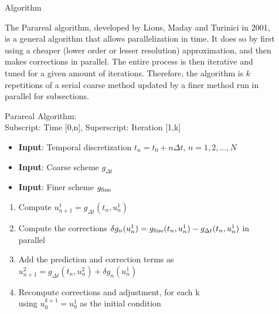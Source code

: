 \documentclass[final]{beamer}
\newlength{\sepwid}
\newlength{\onecolwid}
\begin{document}
\begin{frame}[t]
\begin{columns}[t]
\begin{column}{\onecolwid}
\begin{block}{Algorithm}

The Parareal algorithm, developed by Lions, Maday and Turinici in 2001, is
a general algorithm that allows parallelization in time. It does so by first using a
cheaper (lower order or lesser resolution) approximation, and then makes
corrections in parallel. The entire process is then iterative and tuned for a
given amount of iterations. Therefore, the algorithm is $k$ repetitions of a
serial coarse method updated by a finer method run in parallel for subsections.

Parareal Algorithm:\\
Subscript: Time [0,n], Superscript: Iteration [1,k]
\begin{itemize}
    \item \textbf{Input}: Temporal discretization $t_n = t_0 + n \Delta t, \, n =
        1,2,\ldots,N$
    \item \textbf{Input}: Coarse scheme $g_{\Delta t}$
    \item \textbf{Input}: Finer scheme $g_{\textnormal{fine}}$
\end{itemize}

\begin{enumerate}
    \item Compute $u^1_{n+1} = g_{\Delta t}(t_n, u^1_n)$
    \item Compute the corrections $\delta g_n(u^1_n) =
        g_{\textnormal{fine}}(t_n, u^1_n) - g_{\Delta t}(t_n, u^1_n)$ in parallel
    \item Add the prediction and correction terms as $u^2_{n+1} = g_{\Delta
        t}(t_n, u^2_n) + \delta g_n(u^1_n)$
    \item Recompute corrections and adjustment, for each k \\ using
        $u^{k+1}_0 = u^1_0$ as the initial condition
\end{enumerate}
\end{block}



\end{column} %

\begin{column}{\sepwid}\end{column} %

\begin{column}{\onecolwid} %


\end{column}
\end{columns}
\end{frame}
\end{document}
